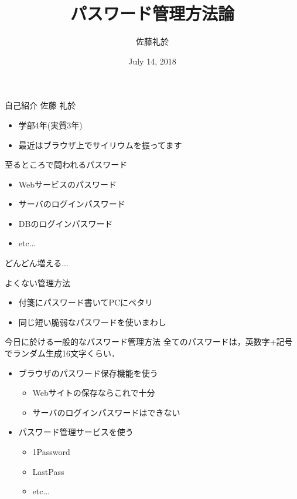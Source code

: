 \documentclass{beamer}
\title{パスワード管理方法論}
\author{佐藤礼於}
\date{July 14, 2018}
\begin{document}
\frame{\maketitle}

\begin{frame}{自己紹介}
  \centering \Large 佐藤 礼於

  \begin{itemize}
    \item 学部4年(実質3年)
    \item 最近はブラウザ上でサイリウムを振ってます
  \end{itemize}
\end{frame}


\begin{frame}{至るところで問われるパスワード}
  \begin{itemize}
    \item Webサービスのパスワード
    \item サーバのログインパスワード
    \item DBのログインパスワード
    \item etc...
  \end{itemize}

  どんどん増える...
\end{frame}

\begin{frame}{よくない管理方法}
  \begin{itemize}
    \item 付箋にパスワード書いてPCにペタリ
    \item 同じ短い脆弱なパスワードを使いまわし
  \end{itemize}
\end{frame}

\begin{frame}{今日に於ける一般的なパスワード管理方法}
  全てのパスワードは，英数字+記号でランダム生成16文字くらい．
  \begin{itemize}
    \item ブラウザのパスワード保存機能を使う
      \begin{itemize}
        \item Webサイトの保存ならこれで十分
        \item サーバのログインパスワードはできない
      \end{itemize}
    \item パスワード管理サービスを使う
      \begin{itemize}
        \item 1Password
        \item LastPass
        \item etc...
      \end{itemize}
  \end{itemize}
\end{frame}
\end{document}
